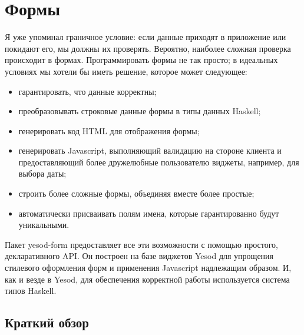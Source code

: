 \chapter{Формы}\label{chap:forms}
Я уже упоминал граничное условие: если данные приходят в приложение или
покидают его, мы должны их проверять. Вероятно, наиболее сложная проверка
происходит в формах.  Программировать формы не так просто; в идеальных
условиях мы хотели бы иметь решение, которое может следующее:

\begin{itemize}
    \item гарантировать, что данные корректны;
    \item преобразовывать строковые данные формы в типы данных Haskell;
    \item генерировать код HTML для отображения формы;
    \item генерировать Javascript, выполняющий валидацию на стороне клиента и
        предоставляющий более дружелюбные пользователю виджеты, например, для
        выбора даты;
    \item строить более сложные формы, объединяя вместе более простые;
    \item автоматически присваивать полям имена, которые гарантированно будут
        уникальными.
\end{itemize}

Пакет yesod-form предоставляет все эти возможности с помощью простого,
декларативного API. Он построен на базе виджетов Yesod для упрощения стилевого
оформления форм и применения Javascript надлежащим образом. И, как и везде в
Yesod, для обеспечения корректной работы используется система типов Haskell.

\section{Краткий обзор}


